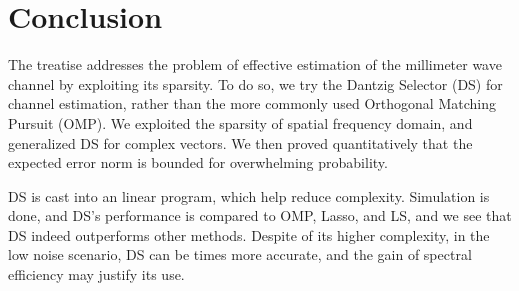 
\chapter {Conclusion}

The treatise addresses the problem of effective estimation of the millimeter wave channel by exploiting its sparsity.
To do so, we try the Dantzig Selector (DS) for channel estimation, rather than the more commonly used Orthogonal Matching Pursuit (OMP).
We exploited the sparsity of spatial frequency domain, and generalized DS for complex vectors.
We then proved quantitatively that the expected error norm is bounded for overwhelming probability.

DS is cast into an linear program, which help reduce complexity.
Simulation is done, and DS's performance is compared to OMP, Lasso, and LS, and we see that DS indeed outperforms other methods.
Despite of its higher complexity, in the low noise scenario, DS can be  times more accurate, and the gain of spectral efficiency may justify its use.




